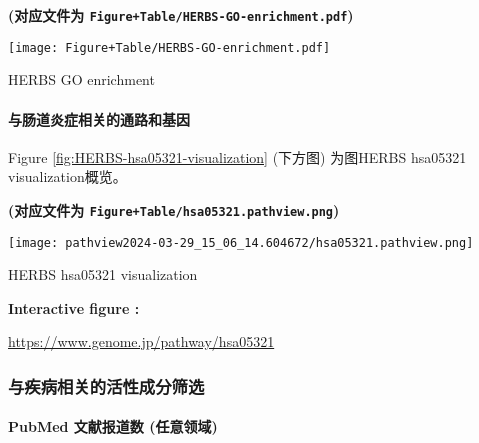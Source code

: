 \documentclass[
]{article}
\begin{document}
\textbf{(对应文件为 \texttt{Figure+Table/HERBS-GO-enrichment.pdf})}

\def\@captype{figure}
\begin{center}
\texttt{[image: Figure+Table/HERBS-GO-enrichment.pdf]}
\caption{HERBS GO enrichment}\label{fig:HERBS-GO-enrichment}
\end{center}

\hypertarget{ux4e0eux80a0ux9053ux708eux75c7ux76f8ux5173ux7684ux901aux8defux548cux57faux56e0}{%
\paragraph{与肠道炎症相关的通路和基因}\label{ux4e0eux80a0ux9053ux708eux75c7ux76f8ux5173ux7684ux901aux8defux548cux57faux56e0}}

Figure \ref{fig:HERBS-hsa05321-visualization} (下方图) 为图HERBS hsa05321 visualization概览。

\textbf{(对应文件为 \texttt{Figure+Table/hsa05321.pathview.png})}

\def\@captype{figure}
\begin{center}
\texttt{[image: pathview2024-03-29\_15\_06\_14.604672/hsa05321.pathview.png]}
\caption{HERBS hsa05321 visualization}\label{fig:HERBS-hsa05321-visualization}
\end{center}
\begin{center}\begin{tcolorbox}[colback=gray!10, colframe=gray!50, width=0.9\linewidth, arc=1mm, boxrule=0.5pt]
\textbf{
Interactive figure
:}

\vspace{0.5em}

    \url{https://www.genome.jp/pathway/hsa05321}

\vspace{2em}
\end{tcolorbox}
\end{center}

\hypertarget{ux4e0eux75beux75c5ux76f8ux5173ux7684ux6d3bux6027ux6210ux5206ux7b5bux9009}{%
\subsubsection{与疾病相关的活性成分筛选}\label{ux4e0eux75beux75c5ux76f8ux5173ux7684ux6d3bux6027ux6210ux5206ux7b5bux9009}}

\hypertarget{pubmed-ux6587ux732eux62a5ux9053ux6570-ux4efbux610fux9886ux57df}{%
\paragraph{PubMed 文献报道数 (任意领域)}\label{pubmed-ux6587ux732eux62a5ux9053ux6570-ux4efbux610fux9886ux57df}}
\end{document}
